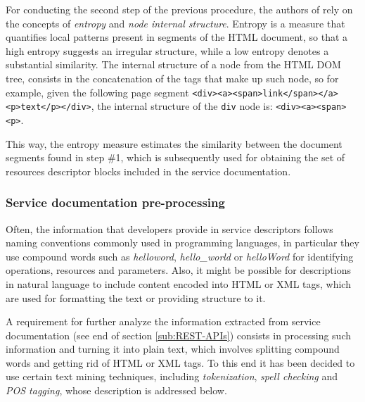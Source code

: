 For conducting the second step of the previous procedure, the authors of \cite{Ly:2012} rely on the concepts of \emph{entropy} and \emph{node internal structure}. Entropy is a measure that quantifies local patterns present in segments of the HTML document, so that a high entropy suggests
an irregular structure, while a low entropy denotes a substantial similarity. The internal structure of a node from the HTML DOM tree, consists in the concatenation of the tags that make up such node, so for example, given the following page segment \texttt{<div><a><span>link</span></a><p>text</p></div>}, the internal structure of the \texttt{div} node is: \texttt{<div><a><span><p>}.

This way, the entropy measure estimates the similarity between the document segments found in step \#1, which is subsequently used for obtaining the set of resources descriptor blocks included in the service documentation.

\subsubsection{Service documentation pre-processing}
\label{subsub:Service-documentation-cleaning}
Often, the information that developers provide in service descriptors follows naming conventions commonly used in programming languages, in particular they use compound words such as \emph{helloword}, \emph{hello\_world} or \emph{helloWord} for identifying operations, resources and parameters. Also, it might be possible for descriptions in natural language to include content encoded into HTML or XML tags, which are used for formatting the text or providing structure to it. 

A requirement for further analyze the information extracted from service documentation (see end of section \ref{sub:REST-APIs}) consists in processing such information and turning it into plain text, which involves splitting compound words and getting rid of HTML or XML tags. To this end it has been decided to use certain text mining techniques, including \emph{tokenization}, \emph{spell checking }and \emph{POS tagging}, whose description is addressed below. 

